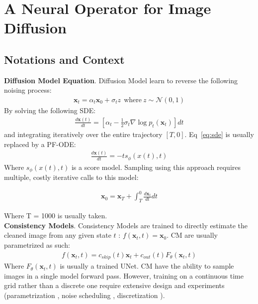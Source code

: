\section{A Neural Operator for Image Diffusion}

\subsection{Notations and Context}

\noindent \textbf{Diffusion Model Equation}. Diffusion Model \cite{song2021scorebasedgenerativemodelingstochastic} learn to reverse the following noising process:
\begin{align*}
  \mathbf{x}_t = \alpha_t \mathbf{x}_0 + \sigma_t z \: \: \mbox{where} \: z \sim \mathcal{N}(0, 1)
\end{align*}
\noindent By solving the following SDE:
\begin{align}
  \frac{d\mathbf{x}(t)}{dt} = \left[ \alpha_t - \frac{1}{2}\sigma_t \nabla \log p_t(\mathbf{x}_t) \right] dt \label{eq:sde}
\end{align}
\noindent and integrating iteratively over the entire trajectory $[T, 0]$. Eq~\ref{eq:sde} is usually replaced by a PF-ODE:
\begin{align*}
  \frac{d\mathbf{x}(t)}{dt} = -ts_{\phi}(x(t), t)
\end{align*}
\noindent Where $s_{\phi}(x(t), t)$ is a score model. Sampling using this approach requires multiple, costly iterative calls to this model:

\begin{align*}
  \mathbf{x}_0 = \mathbf{x}_T + \int^{0}_T \frac{d \mathbf{x}_t}{dt}dt
\end{align*}

\noindent Where T = 1000 is usually taken. \\

\noindent \textbf{Consistency Models}. Consistency Models \cite{song2023consistencymodels} are trained to directly estimate the cleaned image from any given state $t$ :  $f(\mathbf{x}_t, t) = \mathbf{x}_0$. CM are usually parametrized as such:
\begin{align}
  f(\mathbf{x}_t, t) = c_{skip}(t) \mathbf{x}_t + c_{out}(t) F_{\theta}(\mathbf{x}_t, t)
\end{align}
\noindent Where $F_{\theta}(\mathbf{x}_t, t)$ is usually a trained UNet. CM have the ability to sample images in a single model forward pass. However, training on a continuous time grid rather than a discrete one require extensive design and experiments (parametrization \cite{lu2025simplifyingstabilizingscalingcontinuoustime}, noise scheduling \cite{geng2024consistencymodelseasy}, discretization \cite{song2023improvedtechniquestrainingconsistency}). \\

